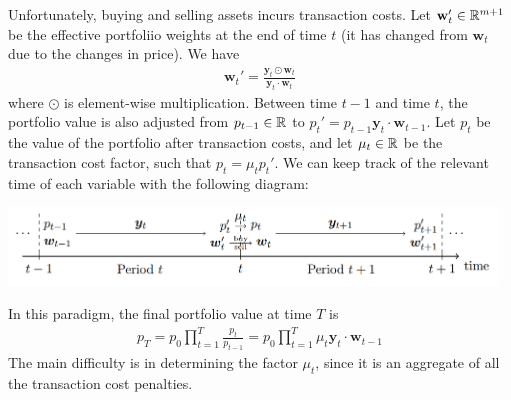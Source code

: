Unfortunately, buying and selling assets incurs transaction costs. Let $\mathbf w_t' \in \mathbb{R}^{m+1}$ be the effective portfoliio weights
at the end of time $t$ (it has changed from $\mathbf w_t$ due to the changes in price). We have
\begin{align*}
  \mathbf w_t' = \frac{\mathbf y_t \odot \mathbf w_t}{\mathbf y_t \cdot \mathbf w_t}
\end{align*}
where $\odot$ is element-wise multiplication. Between time $t-1$ and time $t$, the portfolio value is also
adjusted from $p_{t-1} \in \mathbb{R}$ to $p_t' = p_{t-1} \mathbf y_t \cdot \mathbf w_{t-1}$. Let $p_t$ be the value of the portfolio
after transaction costs, and let $\mu_t \in \mathbb{R}$ be the transaction cost factor, such that $p_t = \mu_t p_t'$.
We can keep track of the relevant time of each variable with the following diagram:

\begin{center}
  \includegraphics[width=13cm]{transaction_cost_time_updates.png}
\end{center}

In this paradigm, the final portfolio value at time $T$ is
\begin{align*}
  p_T = p_0 \prod_{t=1}^T \frac{p_t}{p_{t-1}} = p_0 \prod_{t=1}^T \mu_t \mathbf y_t \cdot \mathbf w_{t-1}
\end{align*}
The main difficulty is in determining the factor $\mu_t$, since it is an aggregate of all the transaction cost penalties.

